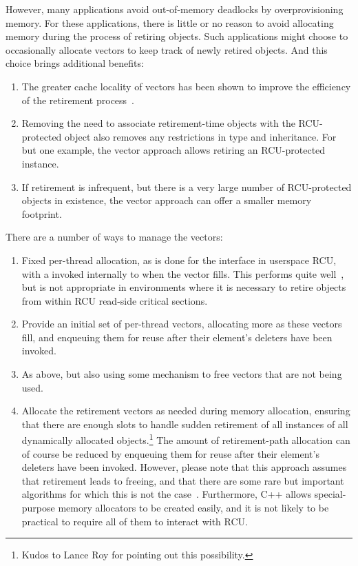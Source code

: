 \documentclass[letterpaper,10pt]{article}
\begin{document}
However, many applications avoid out-of-memory deadlocks by overprovisioning
memory.
For these applications, there is little or no reason to avoid allocating
memory during the process of retiring objects.
Such applications might choose to occasionally allocate vectors to
keep track of newly retired objects.
And this choice brings additional benefits:

\begin{enumerate}
\item	The greater cache locality of vectors has been shown to
	improve the efficiency of the retirement
	process~\cite{MathieuDesnoyers2012URCU}.
\item	Removing the need to associate retirement-time objects with
	the RCU-protected object also removes any restrictions in
	type and inheritance.
	For but one example, the vector approach allows retiring an
	RCU-protected  instance.
\item	If retirement is infrequent, but there is a very large number
	of RCU-protected objects in existence, the vector approach
	can offer a smaller memory footprint.
\end{enumerate}

There are a number of ways to manage the vectors:

\begin{enumerate}
\item	Fixed per-thread allocation, as is done for the 
	interface in userspace RCU, with a 
	invoked internally to  when the vector fills.
	This performs quite well~\cite{MathieuDesnoyers2012URCU}, but
	is not appropriate in environments where it is necessary to
	retire objects from within RCU read-side critical sections.
\item	Provide an initial set of per-thread vectors, allocating more
	as these vectors fill, and enqueuing them for reuse after
	their element's deleters have been invoked.
\item	As above, but also using some mechanism to free vectors that
	are not being used.
\item	Allocate the retirement vectors as needed during memory allocation,
	ensuring that there are enough slots to handle sudden
	retirement of all instances of all dynamically allocated
	objects.\footnote{
		Kudos to Lance Roy for pointing out this possibility.}
	The amount of retirement-path allocation can of course be reduced
	by enqueuing them for reuse after their element's deleters have
	been invoked.
	However, please note that this approach assumes
	that retirement leads to freeing, and that there are some
	rare but important algorithms for which this is not the
	case~\cite{GauthamShenoy2006RCUrwlock,SrivatsaSBhat2014RCUrwlock,RanLiu2014PassiveRWLock,PedroRmalhete2015rwlockRCU,McKenney98}.
	Furthermore, C++ allows special-purpose memory allocators to
	be created easily, and it is not likely to be practical to
	require all of them to interact with RCU.
\end{enumerate}
\end{document}
